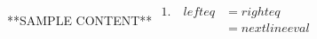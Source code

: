 \documentclass[12pt]{article}
\begin{document}
**SAMPLE CONTENT**
$\begin{aligned}
1.\quad left eq &= right eq \\
& = next line eval \\
\end{aligned}$
\end{document}
